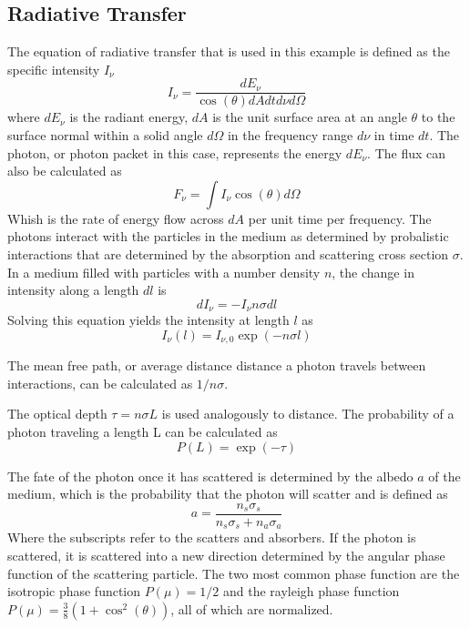 \documentclass[a4paper]{article}
\begin{document}
\subsection{Radiative Transfer}
The equation of radiative transfer that is used in this example is defined as the specific intensity $I_\nu$
\begin{equation}
I_\nu = \frac{dE_\nu}{\cos(\theta)dA dt d\nu d\Omega}
\end{equation}
where $dE_\nu$ is the radiant energy, $dA$ is the unit surface area at an angle $\theta$ to the surface normal within a solid angle $d\Omega$ in the frequency range $d\nu$ in time $dt$. 
The photon, or photon packet in this case, represents the energy $dE_\nu$. The flux can also be calculated as
\begin{equation}
F_\nu = \int I_\nu \cos(\theta) d\Omega
\end{equation}
Whish is the rate of energy flow across $dA$ per unit time per frequency. The photons interact with the particles in the medium as determined by probalistic interactions that are determined by the absorption and scattering cross section $\sigma$.
In a medium filled with particles with a number density $n$, the change in intensity along a length $dl$ is
\begin{equation}
dI_\nu = -I_\nu n \sigma dl
\end{equation}
Solving this equation yields the intensity at length $l$ as
\begin{equation}
I_\nu(l) = I_{\nu,0} \exp(-n \sigma l)
\end{equation}

The mean free path, or average distance distance a photon travels between interactions, can be calculated as $1 / n \sigma$.

The optical depth $\tau = n \sigma L$ is used analogously to distance. The probability of a photon traveling a length L can be calculated as
\begin{equation}
P(L) = \exp(-\tau)
\end{equation}

The fate of the photon once it has scattered is determined by the albedo $a$ of the medium, which is the probability that the photon will scatter and is defined as
\begin{equation}
a = \frac{n_s\sigma_s}{n_s\sigma_s + n_a\sigma_a}
\end{equation}
Where the subscripts refer to the scatters and absorbers. If the photon is scattered, it is scattered into a new direction determined by the angular phase function of the scattering particle. The two most common phase function are the isotropic phase function $P(\mu)=1/2$ and the rayleigh phase function $P(\mu) = \frac{3}{8}(1 + \cos^2(\theta))$, all of which are normalized.
\end{document}
